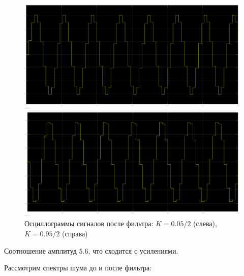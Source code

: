 \documentclass[12pt,a4paper]{article}
\begin{document}
	\begin{figure}[H]
		\centering
		\begin{minipage}[b]{.5\textwidth}
			\includegraphics[width=0.9\linewidth]{res/2_5_005.png}
		\end{minipage}%
		\begin{minipage}[b]{.5\textwidth}
			\includegraphics[width=0.9\linewidth]{res/2_5_095.png}
		\end{minipage}
		\caption*{Осциллограммы сигналов после фильтра: $K = 0.05/2$ (слева), $K = 0.95/2$ (справа)}
	\end{figure}

	Соотношение амплитуд $5.6$, что сходится с усилениями.
	
	Рассмотрим спектры шума до и после фильтра:
	
\end{document}
